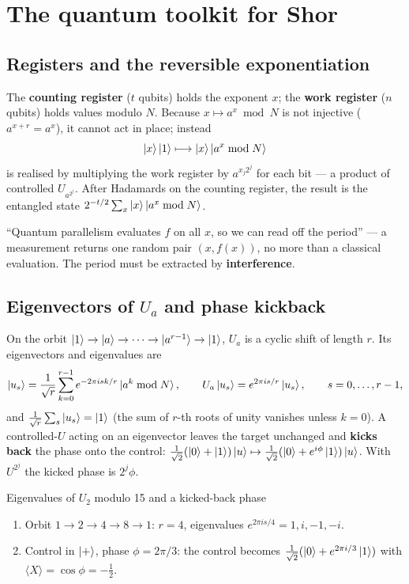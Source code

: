 \documentclass[11pt,a4paper,openany]{book}
\newcounter{wex}[chapter]
\newenvironment{steps}{\begin{enumerate}[label=\textbf{Step \arabic*.}, leftmargin=4.2em, itemsep=2pt]}{\end{enumerate}}
\begin{document}
\section{The quantum toolkit for Shor}
\subsection{Registers and the reversible exponentiation}
The \textbf{counting register} ($t$ qubits) holds the exponent $x$; the \textbf{work register} ($n$ qubits) holds values modulo $N$. Because
$x \mapsto a^x \bmod N$ is not injective ($a^{x+r} = a^x$), it cannot act in place; instead
\[ \ket x\ket1 \longmapsto \ket x\ket{a^x \bmod N} \]
is realised by multiplying the work register by $a^{x_j2^j}$ for each bit --- a product of controlled $U_{a^{2^j}}$. After Hadamards on the counting
register, the result is the entangled state $2^{-t/2}\sum_x\ket x\ket{a^x \bmod N}$.
\begin{trap}
``Quantum parallelism evaluates $f$ on all $x$, so we can read off the period'' --- a measurement returns one random pair $(x, f(x))$, no more than a
classical evaluation. The period must be extracted by \textbf{interference}.
\end{trap}

\subsection{Eigenvectors of $U_a$ and phase kickback}
On the orbit $\ket1 \to \ket a \to \dots \to \ket{a^{r-1}} \to \ket1$, $U_a$ is a cyclic shift of length $r$. Its eigenvectors and eigenvalues are
\[ \ket{u_s} = \frac{1}{\sqrt r}\sum_{k=0}^{r-1}e^{-2\pi isk/r}\ket{a^k \bmod N},\qquad U_a\ket{u_s} = e^{2\pi is/r}\ket{u_s},\qquad s = 0, \dots, r - 1, \]
and $\frac{1}{\sqrt r}\sum_s\ket{u_s} = \ket1$ (the sum of $r$-th roots of unity vanishes unless $k = 0$). A controlled-$U$ acting on an eigenvector leaves the
target unchanged and \textbf{kicks back} the phase onto the control: $\frac{1}{\sqrt2}(\ket0 + \ket1)\ket u \mapsto \frac{1}{\sqrt2}(\ket0 + e^{i\phi}\ket1)\ket u$.
With $U^{2^j}$ the kicked phase is $2^j\phi$.

\begin{wexample}{Eigenvalues of $U_2$ modulo 15 and a kicked-back phase}
\begin{steps}
\item Orbit $1 \to 2 \to 4 \to 8 \to 1$: $r = 4$, eigenvalues $e^{2\pi is/4} = 1, i, -1, -i$.
\item Control in $\ket+$, phase $\phi = 2\pi/3$: the control becomes $\frac{1}{\sqrt2}(\ket0 + e^{2\pi i/3}\ket1)$ with $\langle X\rangle = \cos\phi = -\frac12$.
\end{steps}
\end{wexample}
\end{document}
